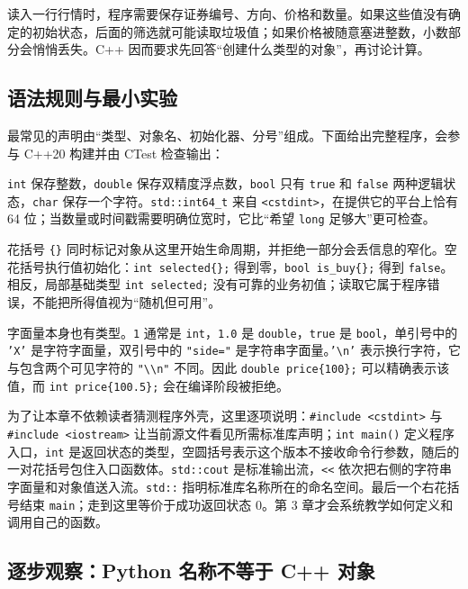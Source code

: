 读入一行行情时，程序需要保存证券编号、方向、价格和数量。如果这些值没有确定的初始状态，后面的筛选就可能读取垃圾值；如果价格被随意塞进整数，小数部分会悄悄丢失。C++ 因而要求先回答“创建什么类型的对象”，再讨论计算。

\subsection{语法规则与最小实验}

最常见的声明由“类型、对象名、初始化器、分号”组成。下面给出完整程序，会参与 C++20 构建并由 CTest 检查输出：



\texttt{int} 保存整数，\texttt{double} 保存双精度浮点数，\texttt{bool} 只有 \texttt{true} 和 \texttt{false} 两种逻辑状态，\texttt{char} 保存一个字符。\texttt{std::int64\_t} 来自 \texttt{<cstdint>}，在提供它的平台上恰有 64 位；当数量或时间戳需要明确位宽时，它比“希望 \texttt{long} 足够大”更可检查。

花括号 \texttt{\{\}} 同时标记对象从这里开始生命周期，并拒绝一部分会丢信息的窄化。空花括号执行值初始化：\texttt{int selected\{\};} 得到零，\texttt{bool is\_buy\{\};} 得到 \texttt{false}。相反，局部基础类型 \texttt{int selected;} 没有可靠的业务初值；读取它属于程序错误，不能把所得值视为“随机但可用”。

字面量本身也有类型。\texttt{1} 通常是 \texttt{int}，\texttt{1.0} 是 \texttt{double}，\texttt{true} 是 \texttt{bool}，单引号中的 \texttt{'X'} 是字符字面量，双引号中的 \texttt{"side="} 是字符串字面量。\texttt{'\textbackslash n'} 表示换行字符，它与包含两个可见字符的 \texttt{"\textbackslash\textbackslash n"} 不同。因此 \texttt{double price\{100\};} 可以精确表示该值，而 \texttt{int price\{100.5\};} 会在编译阶段被拒绝。

为了让本章不依赖读者猜测程序外壳，这里逐项说明：\texttt{\#include <cstdint>} 与 \texttt{\#include <iostream>} 让当前源文件看见所需标准库声明；\texttt{int main()} 定义程序入口，\texttt{int} 是返回状态的类型，空圆括号表示这个版本不接收命令行参数，随后的一对花括号包住入口函数体。\texttt{std::cout} 是标准输出流，\texttt{<<} 依次把右侧的字符串字面量和对象值送入流。\texttt{std::} 指明标准库名称所在的命名空间。最后一个右花括号结束 \texttt{main}；走到这里等价于成功返回状态 0。第 3 章才会系统教学如何定义和调用自己的函数。

\subsection{逐步观察：Python 名称不等于 C++ 对象}

